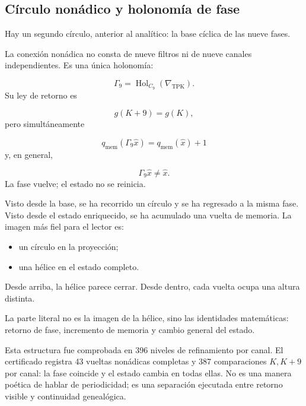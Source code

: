 \subsection{Círculo nonádico y holonomía de fase}
Hay un segundo círculo, anterior al analítico: la base cíclica de las nueve fases.\par
La conexión nonádica no consta de nueve filtros ni de nueve canales independientes. Es una única holonomía:\par
\[
\Gamma_9
=
\operatorname{Hol}_{C_9}
(\nabla_{\mathrm{TPK}}).
\]
Su ley de retorno es\par
\[
g(K+9)=g(K),
\]
pero simultáneamente\par
\[
q_{\mathrm{mem}}
(\Gamma_9\widehat x)
=
q_{\mathrm{mem}}(\widehat x)+1
\]
y, en general,\par
\[
\Gamma_9\widehat x
\neq
\widehat x.
\]
La fase vuelve; el estado no se reinicia.\par
Visto desde la base, se ha recorrido un círculo y se ha regresado a la misma fase. Visto desde el estado enriquecido, se ha acumulado una vuelta de memoria. La imagen más fiel para el lector es:\par
\begin{itemize}
\item un círculo en la proyección;
\item una hélice en el estado completo.
\end{itemize}
Desde arriba, la hélice parece cerrar. Desde dentro, cada vuelta ocupa una altura distinta.\par
La parte literal no es la imagen de la hélice, sino las identidades matemáticas: retorno de fase, incremento de memoria y cambio general del estado.\par
Esta estructura fue comprobada en 396 niveles de refinamiento por canal. El certificado registra 43 vueltas nonádicas completas y 387 comparaciones \(K,K+9\) por canal: la fase coincide y el estado cambia en todas ellas. No es una manera poética de hablar de periodicidad; es una separación ejecutada entre retorno visible y continuidad genealógica.\par
{}
